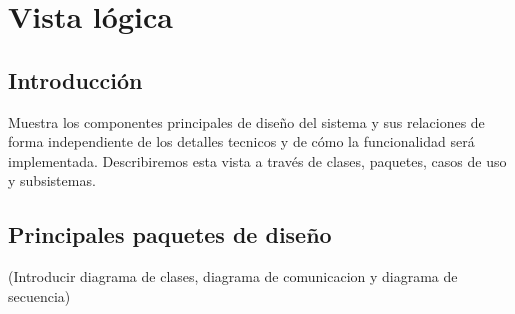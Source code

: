 \chapter{Vista l\'ogica}
\section{Introducci\'on}
Muestra los componentes principales de dise\~no del sistema y sus relaciones de forma independiente de los detalles tecnicos y de c\'omo la funcionalidad ser\'a implementada. Describiremos esta vista a trav\'es de clases, paquetes, casos de uso y subsistemas.
\section{Principales paquetes de dise\~no}


(Introducir diagrama de clases, diagrama de comunicacion y diagrama de secuencia)

